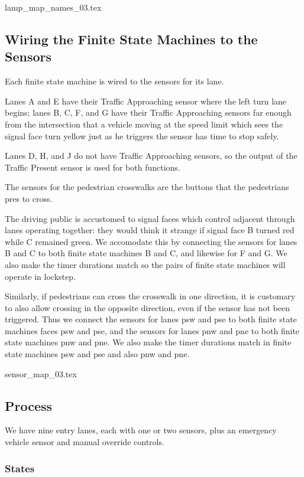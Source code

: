 \documentclass[letterpaper,twoside]{article}
\begin{document}
 {lamp_map_names_03.tex}

\subsection{Wiring the Finite State Machines to the Sensors}

Each finite state machine is wired to the sensors
for its lane.

Lanes A and E have their Traffic Approaching sensor where
the left turn lane begins; lanes B, C, F, and G have their
Traffic Approaching sensors far enough from the intersection that a vehicle
moving at the speed limit which sees the signal face turn yellow
just as he triggers the sensor has time to stop safely.

Lanes D, H, and J do not have Traffic Approaching sensors, so the output
of the Traffic Present sensor is used for both functions.

The sensors for the pedestrian crosswalks are the buttons that
the pedestrians pres to cross.

The driving public is accustomed to signal faces which control
adjacent through lanes operating together: they would think it strange
if signal face B turned red while C remained green.  We accomodate this
by connecting the sensors for lanes B and C to both finite state machines
B and C, and likewise for F and G.  We also make the timer durations
match so the pairs of finite state machines will operate in lockstep.

Similarly, if pedestrians can cross the crosswalk in one direction,
it is customary to also allow crossing in the opposite direction,
even if the sensor has not been triggered.  Thus we connect the sensors
for lanes psw and pse to both finite state machines faces psw and pse,
and the sensors for lanes pnw and pne to both finite state machines
pnw and pne.  We also make the timer durations match in finite state
machines psw and pse and also pnw and pne.

 {sensor_map_03.tex}

\subsection{Process}

We have nine entry lanes, each with one or two sensors, plus an emergency
vehicle sensor and manual override controls.

\subsubsection{States}
\end{document}
